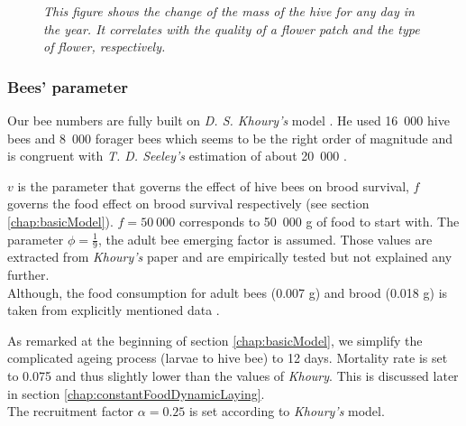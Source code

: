 			\begin{figure}[H]
				\centering
				\caption{\textit{This figure shows the change of the mass of the hive for any day in the year. It correlates with the quality of a flower patch and the type of flower, respectively.}}
				\label{fig:seasonalFlowers}
			\end{figure}
			
		\subsubsection{Bees' parameter}
			\label{chap:beesParameters}
			Our bee numbers are fully built on \textit{D. S. Khoury's} model \cite{khoury13}. He used 16~000 hive bees and 8~000 forager bees which seems to be the right order of magnitude and is congruent with \textit{T. D. Seeley's} estimation of about 20~000 \cite{seeley95}. 
			
			
			$v$ is the parameter that governs the effect of hive bees on brood survival, $f$ governs the food effect on brood survival respectively (see section \ref{chap:basicModel}). $f=50~000$ corresponds to 50~000 g of food to start with. The parameter $\phi=\frac{1}{9}$, the adult bee emerging factor is assumed. Those values are extracted from \textit{Khoury's} paper and are empirically tested but not explained any further.\\ Although, the food consumption for adult bees (0.007 g) and brood (0.018 g) is taken from explicitly mentioned data \cite{harbo93}.
					
			As remarked at the beginning of section \ref{chap:basicModel}, we simplify the complicated ageing process (larvae to hive bee) to 12 days. Mortality rate is set to 0.075 and thus slightly lower than the values of \textit{Khoury}. This is discussed later in section \ref{chap:constantFoodDynamicLaying}.
			\\
			The recruitment factor $\alpha = 0.25$ is set according to \textit{Khoury's} model.
			
		

